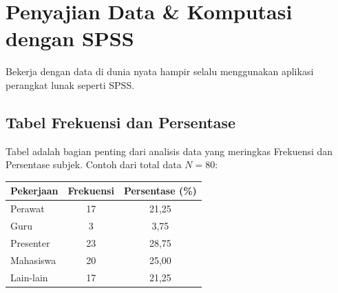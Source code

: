 \documentclass[12pt,a4paper]{article}
\begin{document}
\newpage
\section{Penyajian Data \& Komputasi dengan SPSS}

Bekerja dengan data di dunia nyata hampir selalu menggunakan aplikasi perangkat lunak seperti SPSS.

\subsection{Tabel Frekuensi dan Persentase}
Tabel adalah bagian penting dari analisis data yang meringkas Frekuensi dan Persentase subjek. Contoh dari total data $N=80$:
\begin{table}[h]
\centering
\begin{tabular}{@{}lcc@{}}
\toprule
\textbf{Pekerjaan} & \textbf{Frekuensi} & \textbf{Persentase (\%)} \\ \midrule
Perawat & 17 & 21,25 \\
Guru & 3 & 3,75 \\
Presenter & 23 & 28,75 \\
Mahasiswa & 20 & 25,00 \\
Lain-lain & 17 & 21,25 \\ \bottomrule
\end{tabular}
\end{table}
\end{document}
